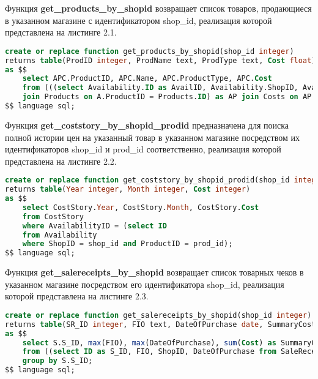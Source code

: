 \documentclass{bmstu}
\begin{document}
Функция \textbf{get\_products\_by\_shopid} возвращает список товаров, продающиеся в указанном магазине с идентификатором shop\_id, реализация которой представлена на листинге 2.1.

\begin{lstlisting}[language=sql, caption={Реализация хранимой функции get\_products\_by\_shopid}]
create or replace function get_products_by_shopid(shop_id integer)
returns table(ProdID integer, ProdName text, ProdType text, Cost float)
as $$
	select APC.ProductID, APC.Name, APC.ProductType, APC.Cost
	from (((select Availability.ID as AvailID, Availability.ShopID, Availability.ProductID from Availability where Availability.ShopID = shop_id) as A 
	join Products on A.ProductID = Products.ID) as AP join Costs on AP.AvailID = Costs.AvailabilityID) as APC;
$$ language sql;
\end{lstlisting}


Функция \textbf{get\_coststory\_by\_shopid\_prodid} предназначена для поиска полной истории цен на указанный товар в указанном магазине посредством их идентификаторов shop\_id и prod\_id соответственно, реализация которой представлена на листинге 2.2.

\begin{lstlisting}[language=sql, caption={Реализация хранимой функции get\_coststory\_by\_shopid\_prodid}]
create or replace function get_coststory_by_shopid_prodid(shop_id integer, prod_id integer)
returns table(Year integer, Month integer, Cost integer)
as $$
	select CostStory.Year, CostStory.Month, CostStory.Cost
	from CostStory
	where AvailabilityID = (select ID
	from Availability
	where ShopID = shop_id and ProductID = prod_id);
$$ language sql;
\end{lstlisting}


Функция \textbf{get\_salereceipts\_by\_shopid} возвращает список товарных чеков в указанном магазине посредством его идентификатора shop\_id, реализация которой представлена на листинге 2.3.

\begin{lstlisting}[language=sql, caption={Реализация хранимой функции get\_salereceipts\_by\_shopid}]
create or replace function get_salereceipts_by_shopid(shop_id integer)
returns table(SR_ID integer, FIO text, DateOfPurchase date, SummaryCost integer)
as $$
	select S.S_ID, max(FIO), max(DateOfPurchase), sum(Cost) as SummaryCost
	from ((select ID as S_ID, FIO, ShopID, DateOfPurchase from SaleReceipts where ShopID = shop_id) as SR join SaleReceiptPositions on SaleReceiptPositions.SaleReceiptID = SR.S_ID) as S join Costs on S.AvailabilityID = Costs.AvailabilityID
	group by S.S_ID;
$$ language sql;
\end{lstlisting}
\end{document}
